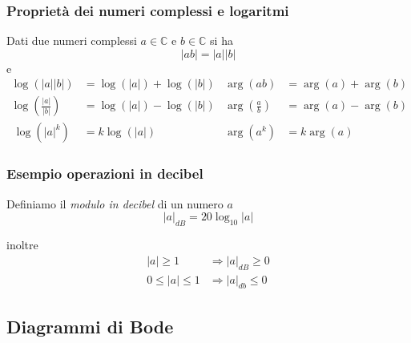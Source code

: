 \documentclass{article}
\numberwithin{equation}{subsection}
\let\oldsubsection\subsection%
\renewcommand{\subsection}{%
  \renewcommand{\theequation}{\thesubsection.\arabic{equation}}%
  \oldsubsection}%
\begin{document}
\subsubsection{Proprietà dei numeri complessi e logaritmi}
Dati due numeri complessi $a\in \mathbb{C}$ e $b \in \mathbb{C}$ si ha
\[
    |ab| = |a||b|
\]
e
\begin{align*}
    \log(|a||b|) &= \log(|a|) + \log(|b|) & \arg(ab) &= \arg(a) + \arg(b)\\
    \log\left(\frac{|a|}{|b|}\right) &= \log(|a|) - \log(|b|) & \arg\left(\frac{a}{b}\right) &= \arg(a) - \arg(b)\\\
    \log(|a|^k) &= k\log(|a|) & \arg(a^k) &= k\arg(a)
\end{align*}


\subsubsection{Esempio operazioni in decibel}
Definiamo il \textit{modulo in decibel} di un numero $a$
\[
    |a|_{dB} = 20\log_{10}|a|
\]
\begin{center}
    \end{center}
inoltre
\begin{align*}
    |a| \geq 1 &\Longrightarrow |a|_{dB} \geq 0\\
    0 \leq |a| \leq 1 &\Longrightarrow |a|_{db} \leq 0
\end{align*}


\subsection{Diagrammi di Bode}
\end{document}
